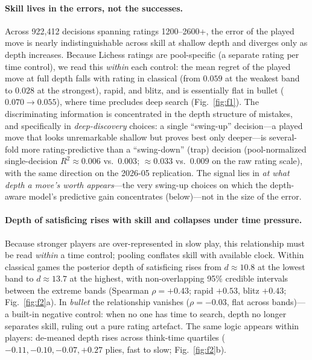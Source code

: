 \documentclass[11pt]{article}
\begin{document}
\paragraph{Skill lives in the errors, not the successes.} Across 922{,}412 decisions spanning
ratings 1200--2600+, the error of the played move is nearly indistinguishable across skill at
shallow depth and diverges only as depth increases. Because Lichess ratings are pool-specific
(a separate rating per time control), we read this \emph{within} each control: the mean regret
of the played move at full depth falls with rating in classical (from $0.059$ at the weakest
band to $0.028$ at the strongest), rapid, and blitz, and is essentially flat in bullet
($0.070\to0.055$), where time precludes deep search (Fig.~\ref{fig:f1}). The discriminating
information is concentrated in the depth structure of mistakes, and specifically in
\emph{deep-discovery} choices: a single ``swing-up'' decision---a played move that looks
unremarkable shallow but proves best only deeper---is several-fold more rating-predictive than a
``swing-down'' (trap) decision (pool-normalized single-decision $R^2\approx0.006$ vs.\ $0.003$;
$\approx0.033$ vs.\ $0.009$ on the raw rating scale), with the same direction on the 2026-05
replication. The signal lies in \emph{at what depth a move's worth appears}---the very swing-up
choices on which the depth-aware model's predictive gain concentrates (below)---not in the size of
the error.

\paragraph{Depth of satisficing rises with skill and collapses under time pressure.} Because
stronger players are over-represented in slow play, this relationship must be read
\emph{within} a time control; pooling conflates skill with available clock. Within classical
games the posterior depth of satisficing rises from $d\approx10.8$ at the lowest band to
$d\approx13.7$ at the highest, with non-overlapping 95\% credible intervals between the
extreme bands (Spearman $\rho=+0.43$; rapid $+0.53$, blitz $+0.43$; Fig.~\ref{fig:f2}a). In
\emph{bullet} the relationship vanishes ($\rho=-0.03$, flat across bands)---a built-in
negative control: when no one has time to search, depth no longer separates skill, ruling out
a pure rating artefact. The same logic appears within players: de-meaned depth rises across
think-time quartiles ($-0.11,-0.10,-0.07,+0.27$ plies, fast to slow; Fig.~\ref{fig:f2}b).
\end{document}
